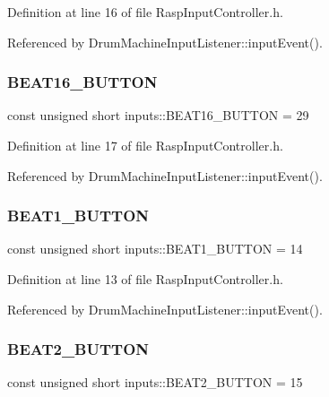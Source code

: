 Definition at line 16 of file Rasp\+Input\+Controller.\+h.



Referenced by Drum\+Machine\+Input\+Listener\+::input\+Event().

\mbox{\label{namespaceinputs_af0f3099a06352ba4eb0808091b908178}} 
\subsubsection{\texorpdfstring{B\+E\+A\+T16\+\_\+\+B\+U\+T\+T\+ON}{BEAT16\_BUTTON}}
{\footnotesize\ttfamily const unsigned short inputs\+::\+B\+E\+A\+T16\+\_\+\+B\+U\+T\+T\+ON = 29}



Definition at line 17 of file Rasp\+Input\+Controller.\+h.



Referenced by Drum\+Machine\+Input\+Listener\+::input\+Event().

\mbox{\label{namespaceinputs_af62021422f469c370f42c78a72504a66}} 
\subsubsection{\texorpdfstring{B\+E\+A\+T1\+\_\+\+B\+U\+T\+T\+ON}{BEAT1\_BUTTON}}
{\footnotesize\ttfamily const unsigned short inputs\+::\+B\+E\+A\+T1\+\_\+\+B\+U\+T\+T\+ON = 14}



Definition at line 13 of file Rasp\+Input\+Controller.\+h.



Referenced by Drum\+Machine\+Input\+Listener\+::input\+Event().

\mbox{\label{namespaceinputs_a8cdd33c9e53b617a2cf8bd32a5b74484}} 
\subsubsection{\texorpdfstring{B\+E\+A\+T2\+\_\+\+B\+U\+T\+T\+ON}{BEAT2\_BUTTON}}
{\footnotesize\ttfamily const unsigned short inputs\+::\+B\+E\+A\+T2\+\_\+\+B\+U\+T\+T\+ON = 15}



